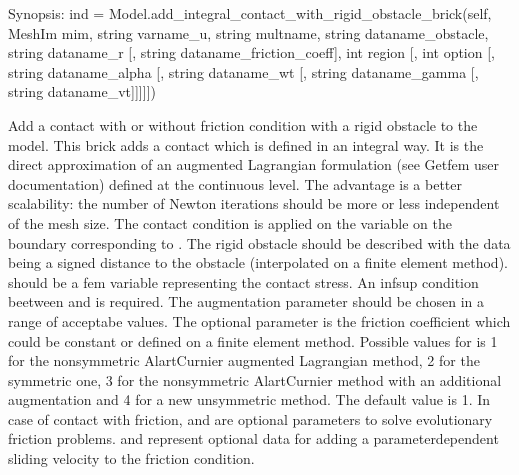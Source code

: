 \documentclass[a4paper,11pt,english]{sphinxmanual}
\begin{document}
\begin{fulllineitems}
\begin{fulllineitems}
\end{fulllineitems}


\begin{fulllineitems}
\label{\detokenize{python/cmdref_Model:getfem.Model.add_integral_contact_with_rigid_obstacle_brick}}
Synopsis: ind = Model.add\_integral\_contact\_with\_rigid\_obstacle\_brick(self,  MeshIm mim, string varname\_u, string multname, string dataname\_obstacle, string dataname\_r {[}, string dataname\_friction\_coeff{]}, int region {[}, int option {[}, string dataname\_alpha {[}, string dataname\_wt {[}, string dataname\_gamma {[}, string dataname\_vt{]}{]}{]}{]}{]})

Add a contact with or without friction condition with a rigid obstacle
to the model. This brick adds a contact which is defined
in an integral way. It is the direct approximation of an augmented
Lagrangian formulation (see Getfem user documentation) defined at the
continuous level. The advantage is a better scalability: the number of
Newton iterations should be more or less independent of the mesh size.
The contact condition is applied on the variable 
on the boundary corresponding to . The rigid obstacle should
be described with the data  being a signed distance to
the obstacle (interpolated on a finite element method).
 should be a fem variable representing the contact stress.
An inf\sphinxhyphen{}sup condition beetween  and  is required.
The augmentation parameter  should be chosen in a
range of acceptabe values.
The optional parameter  is the friction
coefficient which could be constant or defined on a finite element method.
Possible values for  is 1 for the non\sphinxhyphen{}symmetric Alart\sphinxhyphen{}Curnier
augmented Lagrangian method, 2 for the symmetric one, 3 for the
non\sphinxhyphen{}symmetric Alart\sphinxhyphen{}Curnier method with an additional augmentation
and 4 for a new unsymmetric method. The default value is 1.
In case of contact with friction,  and 
are optional parameters to solve evolutionary friction problems.
 and  represent optional data for adding
a parameter\sphinxhyphen{}dependent sliding velocity to the friction condition.


\end{fulllineitems}
\end{fulllineitems}
\end{document}
